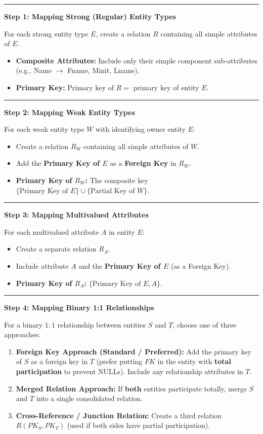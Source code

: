 \documentclass[11pt,a4paper]{article}
\newcommand{\ic}[1]{\mbox{\colorbox{AnthCodeBG}{\footnotesize\ttfamily\textcolor{AnthBlue}{#1}}}}
\newcommand{\concept}[1]{%
  \vspace{3pt}\noindent\textcolor{AnthGreen}{\rule{3.5pt}{10pt}}\enspace
  \textbf{\sffamily\color{AnthDark}#1}\par\vspace{2pt}%
}
\newenvironment{Deriv}[1][Mapping Algorithm]{\begin{tcolorbox}[derivbox, title=#1]}{\end{tcolorbox}}
\begin{document}
\begin{Deriv}[The 7-Step ER-to-Relational Synthesis Algorithm]
\concept{Step 1: Mapping Strong (Regular) Entity Types}
For each strong entity type $E$, create a relation $R$ containing all simple attributes of $E$.
\begin{itemize}
  \item \textbf{Composite Attributes:} Include only their simple component sub-attributes (e.g., \ic{Name} $\to$ \ic{Fname}, \ic{Minit}, \ic{Lname}).
  \item \textbf{Primary Key:} Primary key of $R =$ primary key of entity $E$.
\end{itemize}

\concept{Step 2: Mapping Weak Entity Types}
For each weak entity type $W$ with identifying owner entity $E$:
\begin{itemize}
  \item Create a relation $R_W$ containing all simple attributes of $W$.
  \item Add the \textbf{Primary Key of $E$} as a \textbf{Foreign Key} in $R_W$.
  \item \textbf{Primary Key of $R_W$:} The composite key $\{ \text{Primary Key of } E \} \cup \{ \text{Partial Key of } W \}$.
\end{itemize}

\concept{Step 3: Mapping Multivalued Attributes}
For each multivalued attribute $A$ in entity $E$:
\begin{itemize}
  \item Create a separate relation $R_A$.
  \item Include attribute $A$ and the \textbf{Primary Key of $E$} (as a Foreign Key).
  \item \textbf{Primary Key of $R_A$:} $\{ \text{Primary Key of } E, A \}$.
\end{itemize}

\concept{Step 4: Mapping Binary 1:1 Relationships}
For a binary $1:1$ relationship between entities $S$ and $T$, choose one of three approaches:
\begin{enumerate}
  \item \textbf{Foreign Key Approach (Standard / Preferred):} Add the primary key of $S$ as a foreign key in $T$ (prefer putting $FK$ in the entity with \textbf{total participation} to prevent NULLs). Include any relationship attributes in $T$.
  \item \textbf{Merged Relation Approach:} If \textbf{both} entities participate totally, merge $S$ and $T$ into a single consolidated relation.
  \item \textbf{Cross-Reference / Junction Relation:} Create a third relation $R(PK_S, PK_T)$ (used if both sides have partial participation).
\end{enumerate}


\end{Deriv}
\end{document}
